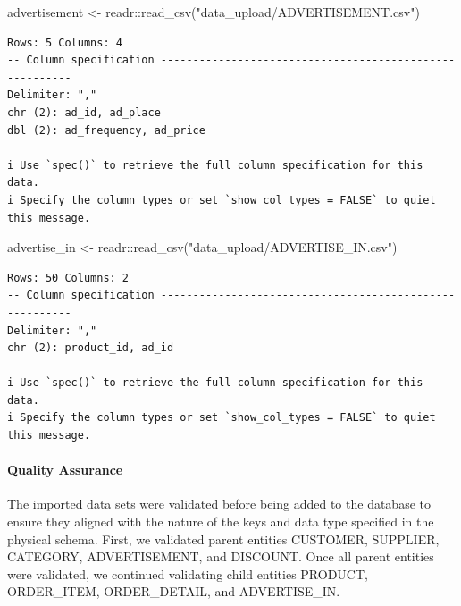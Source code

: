 \documentclass[
  letterpaper,
  DIV=11,
  numbers=noendperiod]{scrartcl}
\let\oldparagraph\paragraph
\renewcommand{\paragraph}[1]{\oldparagraph{#1}\mbox{}}
\newenvironment{Shaded}{\begin{snugshade}}{\end{snugshade}}
\newcommand{\FunctionTok}[1]{\textcolor[rgb]{0.28,0.35,0.67}{#1}}
\newcommand{\NormalTok}[1]{\textcolor[rgb]{0.00,0.23,0.31}{#1}}
\newcommand{\OtherTok}[1]{\textcolor[rgb]{0.00,0.23,0.31}{#1}}
\newcommand{\SpecialCharTok}[1]{\textcolor[rgb]{0.37,0.37,0.37}{#1}}
\newcommand{\StringTok}[1]{\textcolor[rgb]{0.13,0.47,0.30}{#1}}
\begin{document}
\begin{Shaded}
\begin{Highlighting}[]
\NormalTok{advertisement }\OtherTok{\textless{}{-}}\NormalTok{ readr}\SpecialCharTok{::}\FunctionTok{read\_csv}\NormalTok{(}\StringTok{"data\_upload/ADVERTISEMENT.csv"}\NormalTok{)}
\end{Highlighting}
\end{Shaded}

\begin{verbatim}
Rows: 5 Columns: 4
-- Column specification --------------------------------------------------------
Delimiter: ","
chr (2): ad_id, ad_place
dbl (2): ad_frequency, ad_price

i Use `spec()` to retrieve the full column specification for this data.
i Specify the column types or set `show_col_types = FALSE` to quiet this message.
\end{verbatim}

\begin{Shaded}
\begin{Highlighting}[]
\NormalTok{advertise\_in }\OtherTok{\textless{}{-}}\NormalTok{ readr}\SpecialCharTok{::}\FunctionTok{read\_csv}\NormalTok{(}\StringTok{"data\_upload/ADVERTISE\_IN.csv"}\NormalTok{)}
\end{Highlighting}
\end{Shaded}

\begin{verbatim}
Rows: 50 Columns: 2
-- Column specification --------------------------------------------------------
Delimiter: ","
chr (2): product_id, ad_id

i Use `spec()` to retrieve the full column specification for this data.
i Specify the column types or set `show_col_types = FALSE` to quiet this message.
\end{verbatim}

\hypertarget{quality-assurance}{%
\paragraph{Quality Assurance}\label{quality-assurance}}

The imported data sets were validated before being added to the database
to ensure they aligned with the nature of the keys and data type
specified in the physical schema. First, we validated parent entities
CUSTOMER, SUPPLIER, CATEGORY, ADVERTISEMENT, and DISCOUNT. Once all
parent entities were validated, we continued validating child entities
PRODUCT, ORDER\_ITEM, ORDER\_DETAIL, and ADVERTISE\_IN.
\end{document}
